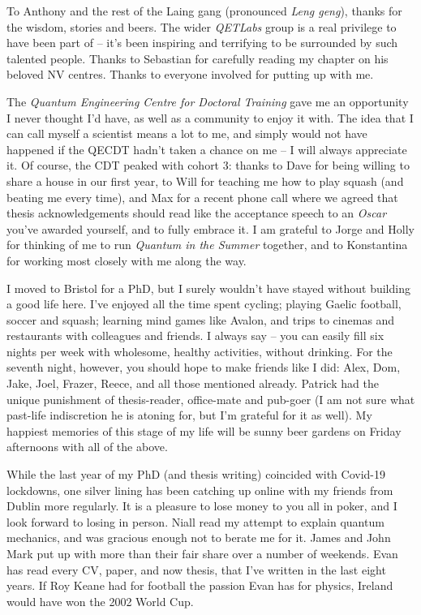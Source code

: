 To Anthony and the rest of the Laing gang (pronounced \emph{Leng geng}), 
    thanks for the wisdom, stories and beers.
The wider \emph{QETLabs} group is a real privilege to have been part of -- 
    it's been inspiring and terrifying to be surrounded by such talented people.
Thanks to Sebastian for carefully reading my chapter on his beloved NV centres.
Thanks to everyone involved for putting up with me. 
\par

The \emph{Quantum Engineering Centre for Doctoral Training} gave me an opportunity I 
    never thought I'd have, as well as a community to enjoy it with. 
The idea that I can call myself a scientist means a lot to me, 
    and simply would not have happened if the QECDT hadn't taken a chance on me -- 
    I will always appreciate it. 
Of course, the CDT peaked with cohort 3:
    thanks to Dave for being willing to share a house in our first year, 
    to Will for teaching me how to play squash (and beating me every time), 
    and Max for a recent phone call where we agreed that thesis acknowledgements should
    read like the acceptance speech to an \emph{Oscar} you've awarded yourself, and to fully embrace it. 
I am grateful to Jorge and Holly for thinking of me to run \emph{Quantum in the Summer} together,
    and to Konstantina for working most closely with me along the way.  
\par 

I moved to Bristol for a PhD, 
    but I surely wouldn't have stayed without building a good life here. 
I've enjoyed all the time spent cycling; playing Gaelic football, soccer and squash;
    learning mind games like Avalon, and trips to cinemas and restaurants with colleagues and friends. 
I always say -- you can easily fill six nights per week with wholesome, healthy activities, 
    without drinking. 
For the seventh night, however, you should hope to make friends like I did:
    Alex, Dom, Jake, Joel, Frazer, Reece, and all those mentioned already.
Patrick had the unique punishment of thesis-reader, office-mate and pub-goer 
    (I am not sure what past-life indiscretion he is atoning for, but I'm grateful for it as well). 
My happiest memories of this stage of my life will be sunny beer gardens on Friday afternoons with all of the above. 

While the last year of my PhD (and thesis writing) coincided with Covid-19 lockdowns, 
    one silver lining has been catching up online with my friends from Dublin more regularly. 
It is a pleasure to lose money to you all in poker, and I look forward to losing in person. 
Niall read my attempt to explain quantum mechanics, 
    and was gracious enough not to berate me for it. 
James and John Mark put up with more than their fair share over a number of weekends. 
Evan has read every CV, paper, and now thesis, that I've written in the last eight years. 
If Roy Keane had for football the passion Evan has for physics, 
    Ireland would have won the 2002 World Cup.
\par 

